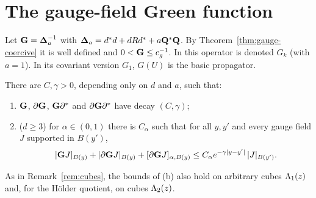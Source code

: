 \section{The gauge-field Green function}\label{sec:gauge-green}

Let $\mathbf G=\boldsymbol{\Delta}_a^{-1}$ with $\boldsymbol{\Delta}_a=d^*d+dRd^*+a\mathbf Q^*\mathbf Q$. By Theorem~\ref{thm:gauge-coercive} it is well defined and $0<\mathbf G\le c_g^{-1}$. In \cite{BalPropI} this operator is denoted $G_k$ (with $a=1$). In \cite{BalBackground,BalVar} its covariant version $G_1$, $G(U)$ is the basic propagator.

\begin{theorem}\label{thm:gauge-green}
There are $C,\gamma>0$, depending only on $d$ and $a$, such that:
\begin{enumerate}[label=(\alph*)]
\item $\mathbf G$, $\partial\mathbf G$, $\mathbf G\partial^*$ and $\partial\mathbf G\partial^*$ have decay $(C,\gamma)$;
\item ($d\ge3$) for $\alpha\in(0,1)$ there is $C_\alpha$ such that for all $y,y'$ and every gauge field $J$ supported in $B(y')$,
\[
|\mathbf G J|_{B(y)}+|\partial\mathbf G J|_{B(y)}+[\partial\mathbf G J]_{\alpha,B(y)}\le C_\alpha e^{-\gamma|y-y'|}\,|J|_{B(y')} .
\]
\end{enumerate}
As in Remark~\ref{rem:cubes}, the bounds of (b) also hold on arbitrary cubes $\Lambda_1(z)$ and, for the H\"older quotient, on cubes $\Lambda_2(z)$.
\end{theorem}

